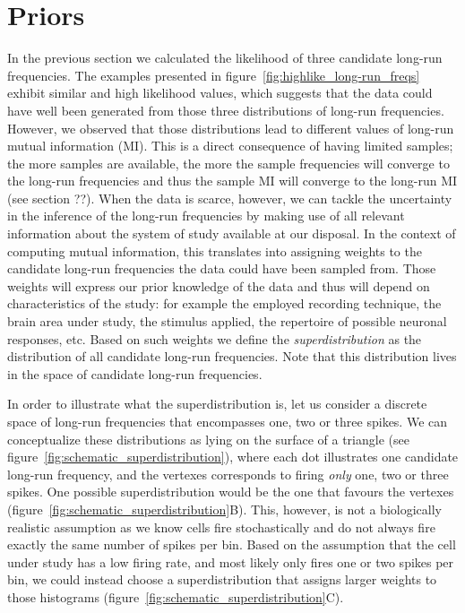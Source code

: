 \section{Priors}\label{sec:priors} 

In the previous section we calculated the likelihood of three candidate long-run frequencies. The examples presented in figure~\ref{fig:highlike_long-run_freqs} exhibit similar and high likelihood values, which suggests that the data could have well been generated from those three distributions of long-run frequencies. However, we observed that those distributions lead to different values of long-run mutual information (MI). This is a direct consequence of having limited samples; the more samples are available, the more the sample frequencies will converge to the long-run frequencies and thus the sample MI will converge to the long-run MI (see section ??). When the data is scarce, however, we can tackle the uncertainty in the inference of the long-run frequencies by making use of all relevant information about the system of study available at our disposal. In the context of computing mutual information, this translates into assigning weights to the candidate long-run frequencies the data could have been sampled from. Those weights will express our prior knowledge of the data and thus will depend on characteristics of the study: for example the employed recording technique, the brain area under study, the stimulus applied, the repertoire of possible neuronal responses, etc. Based on such weights we define the \textit{superdistribution} as the distribution of all candidate long-run frequencies. Note that this distribution lives in the space of candidate long-run frequencies. 

In order to illustrate what the superdistribution is, let us consider a discrete space of long-run frequencies that encompasses one, two or three spikes. We can conceptualize these distributions as lying on the surface of a triangle (see figure~\ref{fig:schematic_superdistribution}), where each dot illustrates one candidate long-run frequency, and the vertexes corresponds to firing \textit{only} one, two or three spikes. One possible superdistribution would be the one that favours the vertexes (figure~\ref{fig:schematic_superdistribution}B). This, however, is not a biologically realistic assumption as we know cells fire stochastically and do not always fire exactly the same number of spikes per bin. Based on the assumption that the cell under study has a low firing rate, and most likely only fires one or two spikes per bin, we could instead choose a superdistribution that assigns larger weights to those histograms (figure~\ref{fig:schematic_superdistribution}C). 



